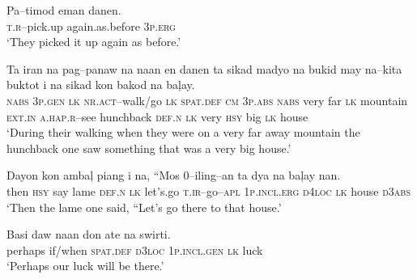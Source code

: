 \ea
\gll  Pa--timod  eman  danen. \\
\textsc{t.r}--pick.up  again.as.before  3\textsc{p.erg} \\
\glt ‘They picked it up again as before.’
\z

\ea
\gll  Ta  iran  na  pag--panaw  na  naan  en  danen  ta  sikad   madyo  na  bukid  may  na--kita  buktot  i  na  sikad   kon  bakod  na  ba\c{l}ay. \\
\textsc{nabs}  3\textsc{p.gen}  \textsc{lk}  \textsc{nr.act}--walk/go  \textsc{lk}  \textsc{spat.def}  \textsc{cm}  3\textsc{p.abs}  \textsc{nabs}  very
far  \textsc{lk}  mountain  \textsc{ext.in}  \textsc{a.hap.r}--see  hunchback  \textsc{def.n}  \textsc{lk}  very
\textsc{hsy}  big  \textsc{lk}  house \\
\glt ‘During their walking when they were on a very far away mountain the hunchback one saw something that was a very big house.’
\z

\ea
\gll Dayon\footnotemark{}  kon  amba\c{l}  piang  i  na,  ``Mos\footnotemark{}  0--iling--an   ta  dya  na  ba\c{l}ay\footnotemark{}  nan. \\
then  \textsc{hsy}  say  lame  \textsc{def.n}  \textsc{lk}  let’s.go  \textsc{t.ir}--go--\textsc{apl}
1\textsc{p.incl.erg}  \textsc{d4loc}  \textsc{lk}  house  \textsc{d3abs} \\
\glt ‘Then the lame one said, “Let’s go there to that house.’
\z

\ea
\gll  Basi  daw  naan  don  ate  na  swirti. \\
perhaps  if/when  \textsc{spat.def}  \textsc{d3loc}  1\textsc{p.incl.gen}  \textsc{lk}  luck \\
\glt ‘Perhaps our luck will be there.’
\z


